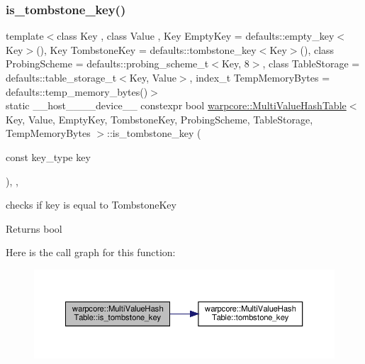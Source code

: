 \subsubsection{\texorpdfstring{is\+\_\+tombstone\+\_\+key()}{is\_tombstone\_key()}}
{\footnotesize\ttfamily template$<$class Key , class Value , Key Empty\+Key = defaults\+::empty\+\_\+key$<$\+Key$>$(), Key Tombstone\+Key = defaults\+::tombstone\+\_\+key$<$\+Key$>$(), class Probing\+Scheme  = defaults\+::probing\+\_\+scheme\+\_\+t$<$\+Key, 8$>$, class Table\+Storage  = defaults\+::table\+\_\+storage\+\_\+t$<$\+Key, Value$>$, index\+\_\+t Temp\+Memory\+Bytes = defaults\+::temp\+\_\+memory\+\_\+bytes()$>$ \\
static \+\_\+\+\_\+host\+\_\+\+\_\+\+\_\+\+\_\+device\+\_\+\+\_\+ constexpr bool \hyperlink{classwarpcore_1_1MultiValueHashTable}{warpcore\+::\+Multi\+Value\+Hash\+Table}$<$ Key, Value, Empty\+Key, Tombstone\+Key, Probing\+Scheme, Table\+Storage, Temp\+Memory\+Bytes $>$\+::is\+\_\+tombstone\+\_\+key (\begin{DoxyParamCaption}\item[{const key\+\_\+type}]{key }\end{DoxyParamCaption})\hspace{0.3cm}{\ttfamily [inline]}, {\ttfamily [static]}, {\ttfamily [noexcept]}}



checks if {\ttfamily key} is equal to {\ttfamily Tombstone\+Key} 

\begin{DoxyReturn}{Returns}
{\ttfamily bool} 
\end{DoxyReturn}
Here is the call graph for this function\+:
\nopagebreak
\begin{figure}[H]
\begin{center}
\leavevmode
\includegraphics[width=350pt]{classwarpcore_1_1MultiValueHashTable_a76fed9a05c9111488189e1b22c435f63_cgraph}
\end{center}
\end{figure}
\mbox{\label{classwarpcore_1_1MultiValueHashTable_a130e94f97c0002895317f086442e8470}} 
